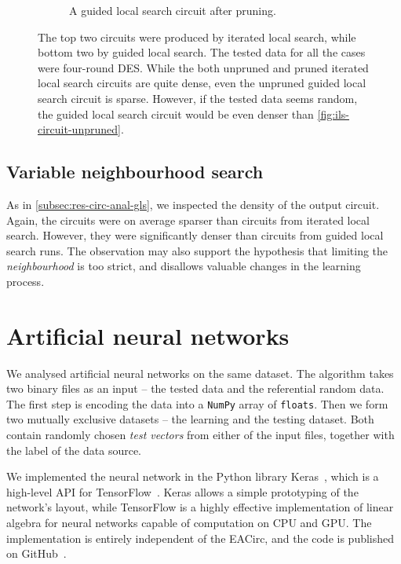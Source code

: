 \documentclass[
    digital,    %
    oneside,    %
    color,
    11pt,
    nocover,
    notable,
    nolof,
    nolot,
]{fithesis3}
\begin{document}
\begin{figure}
\begin{nomar}
\begin{subfigure}{.65\textwidth}
  \caption{A guided local search circuit after pruning.}
  \label{fig:gls-circuit-pruned}
\end{subfigure}
\end{nomar}
\caption{The top two circuits were produced by iterated local search, while bottom two by guided local search. The tested data for all the cases were four-round DES. While the both unpruned and pruned iterated local search circuits are quite dense, even the unpruned guided local search circuit is sparse. However, if the tested data seems random, the guided local search circuit would be even denser than \cref{fig:ils-circuit-unpruned}.}
\label{fig:ils-gls-circuits}
\end{figure}

\subsection{Variable neighbourhood search}
\label{subsec:res-circ-anal-vns}

As in \cref{subsec:res-circ-anal-gls}, we inspected the density of the output circuit. Again, the circuits were on average sparser than circuits from iterated local search. However, they were significantly denser than circuits from guided local search runs. The observation may also support the hypothesis that limiting the \textit{neighbourhood} is too strict, and disallows valuable changes in the learning process.



\section{Artificial neural networks}
\label{sec:res-ann}

We analysed artificial neural networks on the same dataset. The algorithm takes two binary files as an input -- the tested data and the referential random data. The first step is encoding the data into a \texttt{NumPy} array of \texttt{floats}. Then we form two mutually exclusive datasets -- the learning and the testing dataset. Both contain randomly chosen \textit{test vectors} from either of the input files, together with the label of the data source.

We implemented the neural network in the Python library Keras~\cite{chollet2015keras}, which is a high-level API for TensorFlow~\cite{abadi2016tensorflow}. Keras allows a simple prototyping of the network's layout, while TensorFlow is a highly effective implementation of linear algebra for neural networks capable of computation on CPU and GPU. The implementation is entirely independent of the EACirc, and the code is published on GitHub~\cite{EANet}.
\end{document}

